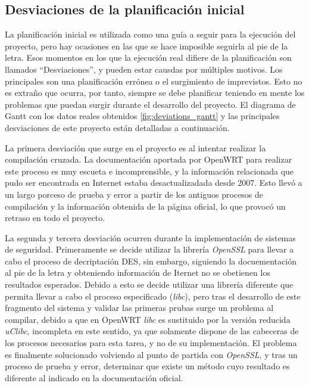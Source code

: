 \documentclass[12pt]{article}
\begin{document}
    \subsection{Desviaciones de la planificación inicial}
        La planificación inicial es utilizada como una guía a seguir para la ejecución del proyecto, pero hay ocasiones en las que se hace imposible seguirla al pie de la letra. Esos momentos en los que la ejecución real difiere de la planificación son llamados ``Desviaciones'', y pueden estar causdas por múltiples motivos. Los principales son una planificación errónea o el surgimiento de imprevistos. Esto no es extraño que ocurra, por tanto, siempre se debe planificar teniendo en mente los problemas que puedan surgir durante el desarrollo del proyecto. El diagrama de Gantt con los datos reales obtenidos \ref{fig:deviations_gantt} y las principales desviaciones de este proyecto están detalladas a continuación.

        La primera desviación que surge en el proyecto es al intentar realizar la compilación cruzada. La documentación aportada por OpenWRT para realizar este proceso es muy escueta e incomprensible, y la información relacionada que pudo ser encontrada en Internet estaba desactualizadada desde 2007. Esto llevó a un largo porceso de prueba y error a partir de los antiguos procesos de compilación y la información obtenida de la página oficial, lo que provocó un retraso en todo el proyecto.

        La segunda y tercera desviación ocurren durante la implementación de sistemas de seguridad. Primeramente se decide utilizar la librería \textit{OpenSSL} para llevar a cabo el proceso de decriptación DES, sin embargo, siguiendo la docuementación al pie de la letra y obteniendo información de Iternet no se obetienen los resultados esperados. Debido a esto se decide utilizar una librería diferente que permita llevar a cabo el proceso especificado (\textit{libc}), pero tras el desarrollo de este fragmento del sistema y validar las primeras prubas surge un problema al compilar, debido a que en OpenWRT \textit{libc} es sustituido por la versión reducida \textit{uClibc}, incompleta en este sentido, ya que solamente dispone de las cabeceras de los procesos necesarios para esta tarea, y no de su implementación. El problema es finalmente solucionado volviendo al punto de partida con \textit{OpenSSL}, y tras un proceso de prueba y error, determinar que existe un método cuyo resultado es diferente al indicado en la documentación oficial.
\end{document}
